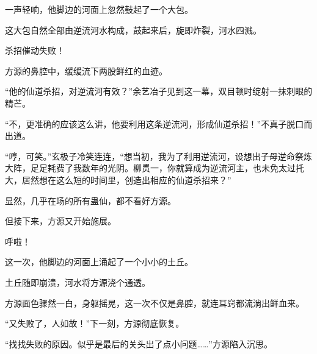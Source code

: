 \begin{this_body}
一声轻响，他脚边的河面上忽然鼓起了一个大包。

这大包自然全部由逆流河水构成，鼓起来后，旋即炸裂，河水四溅。

杀招催动失败！

方源的鼻腔中，缓缓流下两股鲜红的血迹。

“他的仙道杀招，对逆流河有效？”余艺冶子见到这一幕，双目顿时绽射一抹刺眼的精芒。

“不，更准确的应该这么讲，他要利用这条逆流河，形成仙道杀招！”不真子脱口而出道。

“哼，可笑。”玄极子冷笑连连，“想当初，我为了利用逆流河，设想出子母逆命祭炼大阵，足足耗费了我数年的光阴。柳贯一，你就算成为逆流河主，也未免太过托大，居然想在这么短的时间里，创造出相应的仙道杀招来？”

显然，几乎在场的所有蛊仙，都不看好方源。

但接下来，方源又开始施展。

呼啦！

这一次，他脚边的河面上涌起了一个小小的土丘。

土丘随即崩溃，河水将方源浇个通透。

方源面色骤然一白，身躯摇晃，这一次不仅是鼻腔，就连耳窍都流淌出鲜血来。

“又失败了，人如故！”下一刻，方源彻底恢复。

“找找失败的原因。似乎是最后的关头出了点小问题……”方源陷入沉思。

\end{this_body}

